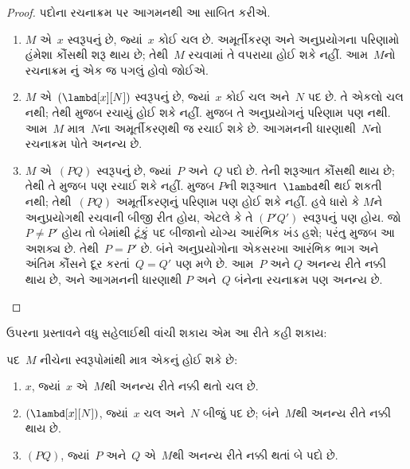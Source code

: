 \documentclass[../../../include/open-logic-section]{subfiles}
\begin{document}
\begin{proof}
  પદોના રચનાક્રમ પર આગમનથી આ સાબિત કરીએ.
  \begin{enumerate}
    \item $M$ એ~$x$ સ્વરૂપનું છે, જ્યાં~$x$ કોઈ ચલ છે.
      અમૂર્તીકરણ અને અનુપ્રયોગના પરિણામો હંમેશા કૌંસથી શરૂ
      થાય છે; તેથી~$M$ રચવામાં તે વપરાયા હોઈ શકે નહીં.
      આમ~$M$નો રચનાક્રમ
      નું
      એક જ પગલું હોવો જોઈએ.
    \item $M$ એ~$(\lambd[x][N])$ સ્વરૂપનું છે, જ્યાં~$x$
      કોઈ ચલ અને~$N$ પદ છે. તે એકલો ચલ નથી; તેથી
      મુજબ રચાયું હોઈ શકે નહીં.  મુજબ
      તે અનુપ્રયોગનું પરિણામ પણ નથી. આમ~$M$ માત્ર~$N$ના
      અમૂર્તીકરણથી જ રચાઈ શકે છે. આગમનની ધારણાથી~$N$નો
      રચનાક્રમ પોતે અનન્ય છે.
    \item $M$ એ~$(PQ)$ સ્વરૂપનું છે, જ્યાં~$P$ અને~$Q$
      પદો છે. તેની શરૂઆત કૌંસથી થાય છે; તેથી તે
      મુજબ પણ રચાઈ શકે નહીં.  મુજબ
      $P$ની શરૂઆત~$\lambd$થી થઈ શકતી નથી; તેથી~$(PQ)$
      અમૂર્તીકરણનું પરિણામ પણ હોઈ શકે નહીં. હવે ધારો કે
      $M$ને અનુપ્રયોગથી રચવાની બીજી રીત હોય, એટલે કે તે
      $(P'Q')$ સ્વરૂપનું પણ હોય. જો~$P\neq P'$ હોય તો
      બેમાંથી ટૂંકું પદ બીજાનો યોગ્ય આરંભિક ખંડ હશે; પરંતુ
       મુજબ આ અશક્ય છે. તેથી~$P=P'$ છે.
      બંને અનુપ્રયોગોના એકસરખા આરંભિક ભાગ અને અંતિમ કૌંસને
      દૂર કરતાં~$Q=Q'$ પણ મળે છે. આમ~$P$ અને
      $Q$ અનન્ય રીતે નક્કી થાય છે, અને આગમનની ધારણાથી
      $P$ અને~$Q$ બંનેના રચનાક્રમ પણ અનન્ય છે.
  \end{enumerate}
\end{proof}


ઉપરના પ્રસ્તાવને વધુ સહેલાઈથી વાંચી શકાય એમ આ રીતે કહી શકાય:
\begin{prop}
  પદ~$M$ નીચેના સ્વરૂપોમાંથી માત્ર એકનું હોઈ શકે છે:
  \begin{enumerate}
    \item $x$, જ્યાં~$x$ એ~$M$થી અનન્ય રીતે નક્કી થતો ચલ છે.
    \item $(\lambd[x][N])$, જ્યાં~$x$ ચલ અને~$N$ બીજું
      પદ છે; બંને~$M$થી અનન્ય રીતે નક્કી થાય છે.
    \item $(PQ)$, જ્યાં~$P$ અને~$Q$ એ~$M$થી અનન્ય રીતે
      નક્કી થતાં બે પદો છે.
  \end{enumerate}
\end{prop}
\end{document}
